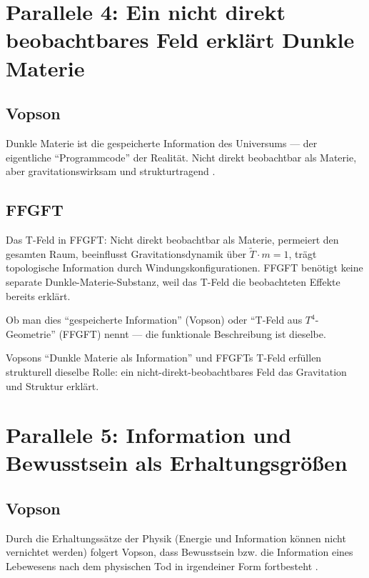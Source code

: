 \section{Parallele 4: Ein nicht direkt beobachtbares Feld erklärt Dunkle Materie}

\subsection{Vopson}

Dunkle Materie ist die gespeicherte Information des Universums --- der
eigentliche ``Programmcode'' der Realität. Nicht direkt beobachtbar als
Materie, aber gravitationswirksam und strukturtragend \cite{Vopson2024}.

\subsection{FFGFT}

Das T-Feld in FFGFT: Nicht direkt beobachtbar als Materie, permeiert den
gesamten Raum, beeinflusst Gravitationsdynamik über $\tilde{T} \cdot m = 1$,
trägt topologische Information durch Windungskonfigurationen. FFGFT benötigt
keine separate Dunkle-Materie-Substanz, weil das T-Feld die beobachteten
Effekte bereits erklärt.

Ob man dies ``gespeicherte Information'' (Vopson) oder ``T-Feld aus
$T^4$-Geometrie'' (FFGFT) nennt --- die funktionale Beschreibung ist dieselbe.

\begin{erkenntnis}
Vopsons ``Dunkle Materie als Information'' und FFGFTs T-Feld erfüllen
strukturell dieselbe Rolle: ein nicht-direkt-beobachtbares Feld das
Gravitation und Struktur erklärt.
\end{erkenntnis}

\section{Parallele 5: Information und Bewusstsein als Erhaltungsgrößen}

\subsection{Vopson}

Durch die Erhaltungssätze der Physik (Energie und Information können nicht
vernichtet werden) folgert Vopson, dass Bewusstsein bzw. die Information eines
Lebewesens nach dem physischen Tod in irgendeiner Form fortbesteht
\cite{Vopson2024}.


